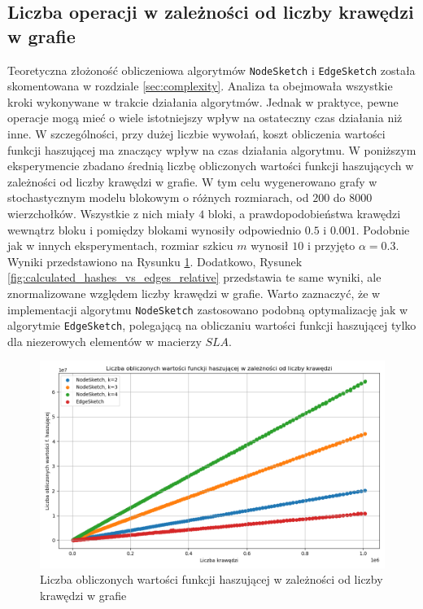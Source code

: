 \subsection{Liczba operacji w zależności od liczby krawędzi w grafie}
    Teoretyczna złożoność obliczeniowa algorytmów \texttt{NodeSketch} i \texttt{EdgeSketch} została skomentowana w rozdziale \ref{sec:complexity}. Analiza ta obejmowała wszystkie kroki wykonywane w trakcie działania algorytmów. Jednak w praktyce, pewne operacje mogą mieć o wiele istotniejszy wpływ na ostateczny czas działania niż inne.     
    W szczególności, przy dużej liczbie wywołań, koszt obliczenia wartości funkcji haszującej
    ma znaczący wpływ na czas działania algorytmu. 
    W poniższym eksperymencie zbadano średnią liczbę obliczonych wartości funkcji haszujących w zależności od liczby krawędzi w grafie. W tym celu wygenerowano grafy w stochastycznym modelu blokowym o różnych rozmiarach, od $200$ do $8000$ wierzchołków. Wszystkie z nich miały $4$ bloki, a prawdopodobieństwa krawędzi wewnątrz bloku i pomiędzy blokami wynosiły odpowiednio $0.5$ i $0.001$. Podobnie jak w innych eksperymentach, rozmiar szkicu $m$ wynosił $10$ i przyjęto $\alpha = 0.3$. Wyniki przedstawiono na Rysunku \ref{fig:calculated_hashes_vs_edges_all}. Dodatkowo, Rysunek \ref{fig:calculated_hashes_vs_edges_relative} przedstawia te same wyniki, ale znormalizowane względem liczby krawędzi w grafie. Warto zaznaczyć, że w implementacji algorytmu \texttt{NodeSketch} zastosowano podobną optymalizację jak w algorytmie \texttt{EdgeSketch}, polegającą na obliczaniu wartości funkcji haszującej tylko dla niezerowych elementów w macierzy $SLA$. 

\begin{figure}[!ht]
    \includegraphics[width=14cm]{img/calculated_hashes_vs_edges_all.png}
    \centering
    \caption[Liczba operacji]{Liczba obliczonych wartości funkcji haszującej w zależności od liczby krawędzi w grafie}
    \label{fig:calculated_hashes_vs_edges_all}
\end{figure}

